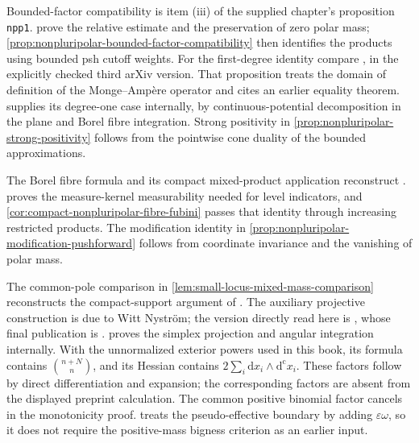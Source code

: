 Bounded-factor compatibility is item (iii) of the supplied chapter's proposition \texttt{npp1}.  prove the relative estimate and the preservation of zero polar mass; \cref{prop:nonpluripolar-bounded-factor-compatibility} then identifies the products using bounded psh cutoff weights. For the first-degree identity compare \cite[Proposition 3.3, pp.~3--4]{ElKadiri2023v3}, in the explicitly checked third arXiv version. That proposition treats the domain of definition of the Monge--Amp\`ere operator and cites an earlier equality theorem.  supplies its degree-one case internally, by continuous-potential decomposition in the plane and Borel fibre integration. Strong positivity in \cref{prop:nonpluripolar-strong-positivity} follows from the pointwise cone duality of the bounded approximations.

The Borel fibre formula and its compact mixed-product application reconstruct \cite[Chapter on non-pluripolar products, lemma \texttt{boundedfibrefubini} and corollary \texttt{compactfibreslicing}]{XiaSampleBook}.  proves the measure-kernel measurability needed for level indicators, and \cref{cor:compact-nonpluripolar-fibre-fubini} passes that identity through increasing restricted products. The modification identity in \cref{prop:nonpluripolar-modification-pushforward} follows from coordinate invariance and the vanishing of polar mass.

The common-pole comparison in \cref{lem:small-locus-mixed-mass-comparison} reconstructs the compact-support argument of \cite[Theorem 1.16 and proof, pp.~217--218]{BEGZ10}. The auxiliary projective construction is due to Witt Nystr\"om; the version directly read here is \cite[Sections 3--4, pp.~4--9]{WittNystrom2017v1}, whose final publication is \cite{WN19}.  proves the simplex projection and angular integration internally. With the unnormalized exterior powers used in this book, its formula contains $\binom{n+N}{n}$, and its Hessian contains $2\sum_i\mathrm dx_i\wedge\mathrm d^{\mathrm c}x_i$. These factors follow by direct differentiation and expansion; the corresponding factors are absent from the displayed preprint calculation. The common positive binomial factor cancels in the monotonicity proof.  treats the pseudo-effective boundary by adding $\varepsilon\omega$, so it does not require the positive-mass bigness criterion as an earlier input.


